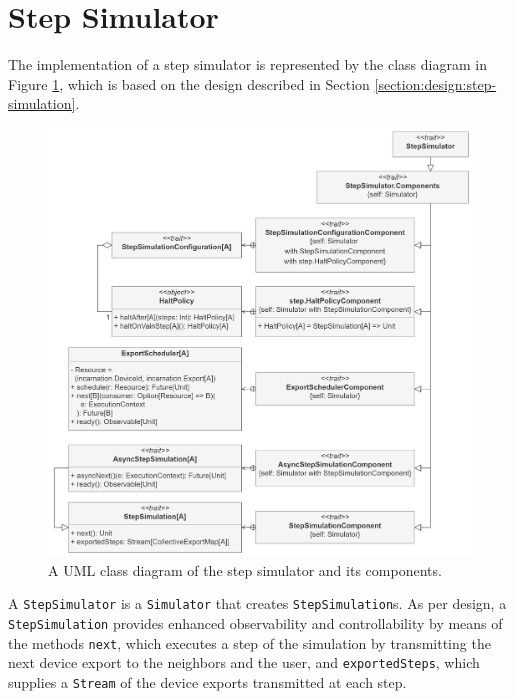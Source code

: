 
\section{Step Simulator}
\label{section:implementation:step-simulator}

The implementation of a step simulator is represented by the class diagram in
Figure \ref{figure:step-simulator-class-diagram}, which is based on the design
described in Section \ref{section:design:step-simulation}.

\begin{figure}[!ht]
  \centering
  \includegraphics[width=1\textwidth]{resources/figures/diagrams/short/step-simulator-class-diagram.pdf}
  \caption[A UML class diagram of the step simulator]{
    A UML class diagram of the step simulator and its components.
  }
  \label{figure:step-simulator-class-diagram}
\end{figure}

A \texttt{StepSimulator} is a \texttt{Simulator} that creates
\texttt{StepSimulation}s. As per design, a \texttt{StepSimulation} provides
enhanced observability and controllability by means of the methods
\texttt{next}, which executes a step of the simulation by transmitting the next
device export to the neighbors and the user, and \texttt{exportedSteps}, which
supplies a \texttt{Stream} of the device exports transmitted at each step.

